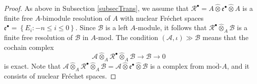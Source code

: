 \documentclass[12pt]{amsart}%
\theoremstyle{plain}
\numberwithin{equation}{section}
\numberwithin{equation}{section}
\numberwithin{theorem}{section}
\numberwithin{lemma}{section}
\numberwithin{remark}{section}
\numberwithin{example}{section}
\numberwithin{proposition}{section}
\numberwithin{definition}{section}
\numberwithin{corollary}{section}
\begin{document}
\begin{proof}
As above in Subsection \ref{subsecTrans}, we assume that $\mathcal{R}%
^{\bullet}=A\widehat{\otimes}\mathfrak{e}^{\bullet}\widehat{\otimes}A$ is a
finite free $A$-bimodule resolution of $A$ with nuclear Fr\'{e}chet spaces
$\mathfrak{e}^{\bullet}=\left\{  E_{i}:-n\leq i\leq0\right\}  $. Since
$\mathcal{B}$ is a left $A$-module, it follows that $\mathcal{R}^{\bullet
}\widehat{\otimes}_{A}\mathcal{B}$ is a finite free resolution of
$\mathcal{B}$ in $A$-mod. The condition $\left(  \mathcal{A},\iota\right)
\gg\mathcal{B}$ means that the cochain complex
\begin{equation}
\mathcal{A}\widehat{\otimes}_{A}\mathcal{R}^{\bullet}\widehat{\otimes}%
_{A}\mathcal{B\rightarrow B}\rightarrow0 \label{ARAB}%
\end{equation}
is exact. Note that $\mathcal{A}\widehat{\otimes}_{A}\mathcal{R}^{\bullet
}\widehat{\otimes}_{A}\mathcal{B}=\mathcal{A}\widehat{\otimes}\mathfrak{e}%
^{\bullet}\widehat{\otimes}\mathcal{B}$ is a complex from $\overline
{\text{mod-}A}$, and it consists of nuclear Fr\'{e}chet spaces.


\end{proof}
\end{document}
